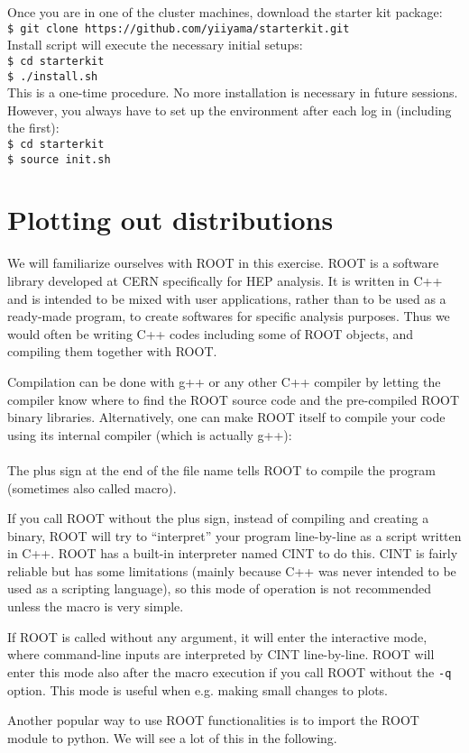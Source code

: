 \documentclass[12pt]{article}
\newcommand{\terminal}[1]{\texttt{\$ #1}}
\begin{document}
Once you are in one of the cluster machines, download the starter kit package: \\
\terminal{git clone https://github.com/yiiyama/starterkit.git} \\
Install script will execute the necessary initial setups: \\
\terminal{cd starterkit} \\
\terminal{./install.sh} \\
This is a one-time procedure. No more installation is necessary in future sessions. However, you always have to set up the environment after each log in (including the first): \\
\terminal{cd starterkit} \\
\terminal{source init.sh} \\

\setcounter{section}{0}

\section{Plotting out distributions}
We will familiarize ourselves with ROOT in this exercise. ROOT is a software library developed at CERN specifically for HEP analysis. It is written in C++ and is intended to be mixed with user applications, rather than to be used as a ready-made program, to create softwares for specific analysis purposes. Thus we would often be writing C++ codes including some of ROOT objects, and compiling them together with ROOT.

Compilation can be done with g++ or any other C++ compiler by letting the compiler know where to find the ROOT source code and the pre-compiled ROOT binary libraries. Alternatively, one can make ROOT itself to compile your code using its internal compiler (which is actually g++): \\
 \\
The plus sign at the end of the file name tells ROOT to compile the program (sometimes also called macro).

If you call ROOT without the plus sign, instead of compiling and creating a binary, ROOT will try to ``interpret'' your program line-by-line as a script written in C++. ROOT has a built-in interpreter named CINT to do this. CINT is fairly reliable but has some limitations (mainly because C++ was never intended to be used as a scripting language), so this mode of operation is not recommended unless the macro is very simple.

If ROOT is called without any argument, it will enter the interactive mode, where command-line inputs are interpreted by CINT line-by-line. ROOT will enter this mode also after the macro execution if you call ROOT without the \texttt{-q} option. This mode is useful when e.g. making small changes to plots.

Another popular way to use ROOT functionalities is to import the ROOT module to python. We will see a lot of this in the following.
\end{document}
